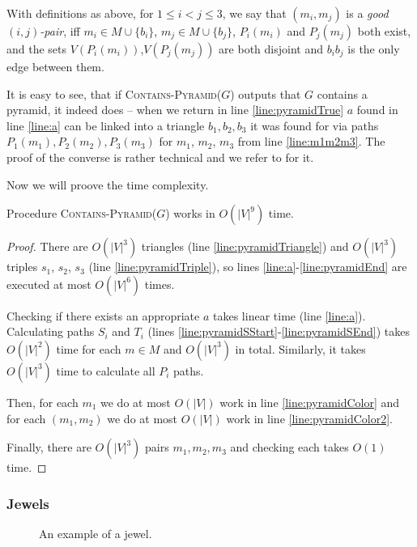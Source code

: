 With definitions as above, for $1 \leq i < j \leq 3$, we say that $(m_i, m_j)$ is a \emph{good $(i, j)$-pair}, iff $m_i \in M \cup \{b_i\}$, $m_j \in M \cup \{b_j\}$, $P_i(m_i)$ and $P_j(m_j)$ both exist, and the sets $V(P_i(m_i))$,$V(P_j(m_j))$ are both disjoint and $b_ib_j$ is the only edge between them.

It is easy to see, that if \textsc{Contains-Pyramid($G$)} outputs that $G$ contains a pyramid, it indeed does -- when we return in line \ref{line:pyramidTrue} $a$ found in line \ref{line:a} can be linked into a triangle $b_1, b_2, b_3$ it was found for via paths $P_1(m_1), P_2(m_2), P_3(m_3)$ for $m_1$, $m_2$, $m_3$ from line \ref{line:m1m2m3}. The proof of the converse is rather technical and we refer to \cite{MC05} for it.

Now we will proove the time complexity.

\begin{theorem}
	Procedure \textsc{Contains-Pyramid($G$)} works in $O(|V|^9)$ time.
\end{theorem}
\begin{proof}
	There are $O(|V|^3)$ triangles (line \ref{line:pyramidTriangle}) and $O(|V|^3)$ triples $s_1$, $s_2$, $s_3$ (line \ref{line:pyramidTriple}), so lines \ref{line:a}-\ref{line:pyramidEnd} are executed at most $O(|V|^6)$ times.

	Checking if there exists an appropriate $a$ takes linear time (line \ref{line:a}). Calculating paths $S_i$ and $T_i$ (lines \ref{line:pyramidSStart}-\ref{line:pyramidSEnd}) takes $O(|V|^2)$ time for each $m \in M$ and $O(|V|^3)$ in total. Similarly, it takes $O(|V|^3)$ time to calculate all $P_i$ paths.

	Then, for each $m_1$ we do at most $O(|V|)$ work in line \ref{line:pyramidColor} and for each $(m_1, m_2)$ we do at most $O(|V|)$ work in line \ref{line:pyramidColor2}.

	Finally, there are $O(|V|^3)$ pairs $m_1, m_2, m_3$ and checking each takes $O(1)$ time.
\end{proof}

\subsubsection{Jewels}

\begin{wrapfigure}{r}{0.35\textwidth}
	
	\caption{An example of a jewel.}
	\vspace{-1.5cm}
\end{wrapfigure}


